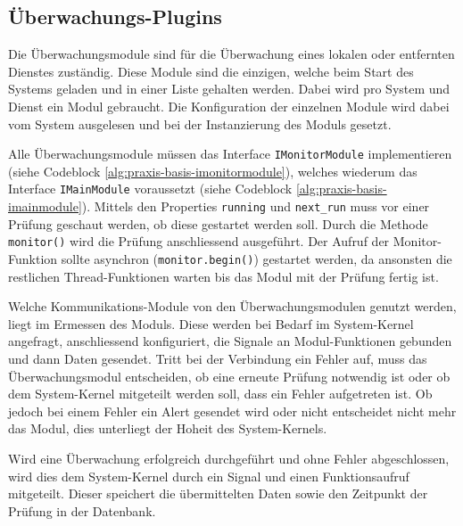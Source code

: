 \subsection{\"Uberwachungs-Plugins} \label{sec:praxis-basis-monitor}
Die \"Uberwachungsmodule sind f\"ur die \"Uberwachung eines lokalen oder entfernten Dienstes zust\"andig. Diese Module sind die einzigen, welche beim Start des Systems geladen und in einer Liste gehalten werden. Dabei wird pro System und Dienst ein Modul gebraucht. Die Konfiguration der einzelnen Module wird dabei vom System ausgelesen und bei der Instanzierung des Moduls gesetzt.

Alle \"Uberwachungsmodule m\"ussen das Interface \texttt{IMonitorModule} implementieren (siehe Codeblock \ref{alg:praxis-basis-imonitormodule}), welches wiederum das Interface \texttt{IMainModule} voraussetzt (siehe Codeblock \ref{alg:praxis-basis-imainmodule}). Mittels den Properties \texttt{running} und \texttt{next\_run} muss vor einer Pr\"ufung geschaut werden, ob diese gestartet werden soll. Durch die Methode \texttt{monitor()} wird die Pr\"ufung anschliessend ausgef\"uhrt. Der Aufruf der Monitor-Funktion sollte asynchron (\texttt{monitor.begin()}) gestartet werden, da ansonsten die restlichen Thread-Funktionen warten bis das Modul mit der Pr\"ufung fertig ist.


Welche Kommunikations-Module von den \"Uberwachungsmodulen genutzt werden, liegt im Ermessen des Moduls. Diese werden bei Bedarf im System-Kernel angefragt, anschliessend konfiguriert, die Signale an Modul-Funktionen gebunden und dann Daten gesendet. Tritt bei der Verbindung ein Fehler auf, muss das \"Uberwachungsmodul entscheiden, ob eine erneute Pr\"ufung notwendig ist oder ob dem System-Kernel mitgeteilt werden soll, dass ein Fehler aufgetreten ist. Ob jedoch bei einem Fehler ein Alert gesendet wird oder nicht entscheidet nicht mehr das Modul, dies unterliegt der Hoheit des System-Kernels.

Wird eine \"Uberwachung erfolgreich durchgef\"uhrt und ohne Fehler abgeschlossen, wird dies dem System-Kernel durch ein Signal und einen Funktionsaufruf mitgeteilt. Dieser speichert die \"ubermittelten Daten sowie den Zeitpunkt der Pr\"ufung in der Datenbank.

